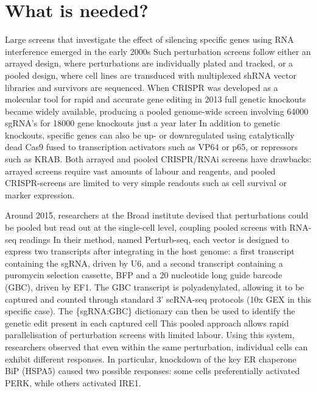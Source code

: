 \section{What is needed?}
Large screens that investigate the effect of silencing specific genes using RNA interference emerged in the early 2000s Such perturbation screens follow either an arrayed design, where perturbations are individually plated and tracked, or a pooled design, where cell lines are transduced with multiplexed shRNA vector libraries and survivors are sequenced. When CRISPR was developed as a molecular tool for rapid and accurate gene editing in 2013 full genetic knockouts became widely available, producing a pooled genome-wide screen involving 64000 sgRNA's for 18000 gene knockouts just a year later In addition to genetic knockouts, specific genes can also be up- or downregulated using catalytically dead Cas9 fused to transcription activators such as VP64 or p65, or repressors such as KRAB. Both arrayed and pooled CRISPR/RNAi screens have drawbacks: arrayed screens require vast amounts of labour and reagents, and pooled CRISPR-screens are limited to very simple readouts such as cell survival or marker expression.

Around 2015, researchers at the Broad institute devised that perturbations could be pooled but read out at the single-cell level, coupling pooled screens with RNA-seq readings In their method, named Perturb-seq, each vector is designed to express two transcripts after integrating in the host genome: a first transcript containing the sgRNA, driven by U6, and a second transcript containing a puromycin selection cassette, BFP and a 20 nucleotide long guide barcode (GBC), driven by EF1\textalpha. The GBC transcript is polyadenylated, allowing it to be captured and counted through standard 3' scRNA-seq protocols (10x GEX in this specific case). The \{sgRNA:GBC\} dictionary can then be used to identify the genetic edit present in each captured cell  This pooled approach allows rapid parallelisation of perturbation screens with limited labour. Using this system, researchers observed that even within the same perturbation, individual cells can exhibit different responses. In particular, knockdown of the key ER chaperone BiP (HSPA5) caused two possible responses: some cells preferentially activated PERK, while others activated IRE1\textalpha.

